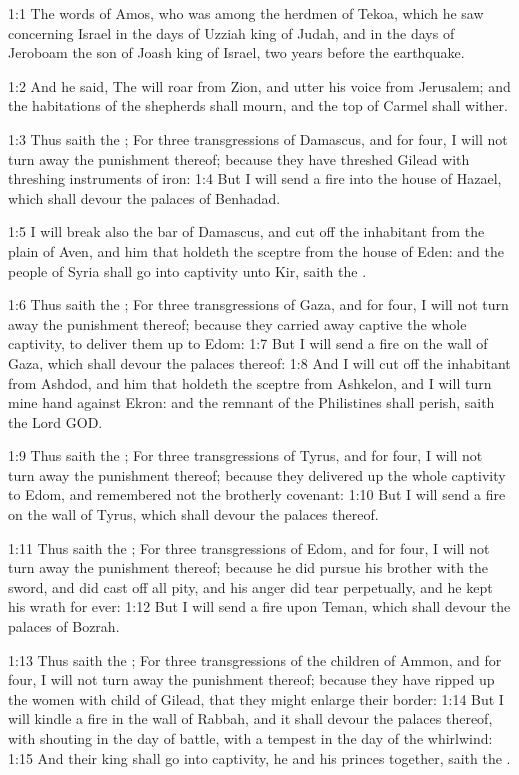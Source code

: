 

1:1 The words of Amos, who was among the herdmen of Tekoa, which he saw concerning Israel in the days of Uzziah king of Judah, and in the days of Jeroboam the son of Joash king of Israel, two years before the earthquake.

1:2 And he said, The \LORD will roar from Zion, and utter his voice from Jerusalem; and the habitations of the shepherds shall mourn, and the top of Carmel shall wither.

1:3 Thus saith the \LORD; For three transgressions of Damascus, and for four, I will not turn away the punishment thereof; because they have threshed Gilead with threshing instruments of iron: 1:4 But I will send a fire into the house of Hazael, which shall devour the palaces of Benhadad.

1:5 I will break also the bar of Damascus, and cut off the inhabitant from the plain of Aven, and him that holdeth the sceptre from the house of Eden: and the people of Syria shall go into captivity unto Kir, saith the \LORD.

1:6 Thus saith the \LORD; For three transgressions of Gaza, and for four, I will not turn away the punishment thereof; because they carried away captive the whole captivity, to deliver them up to Edom: 1:7 But I will send a fire on the wall of Gaza, which shall devour the palaces thereof: 1:8 And I will cut off the inhabitant from Ashdod, and him that holdeth the sceptre from Ashkelon, and I will turn mine hand against Ekron: and the remnant of the Philistines shall perish, saith the Lord GOD.

1:9 Thus saith the \LORD; For three transgressions of Tyrus, and for four, I will not turn away the punishment thereof; because they delivered up the whole captivity to Edom, and remembered not the brotherly covenant: 1:10 But I will send a fire on the wall of Tyrus, which shall devour the palaces thereof.

1:11 Thus saith the \LORD; For three transgressions of Edom, and for four, I will not turn away the punishment thereof; because he did pursue his brother with the sword, and did cast off all pity, and his anger did tear perpetually, and he kept his wrath for ever: 1:12 But I will send a fire upon Teman, which shall devour the palaces of Bozrah.

1:13 Thus saith the \LORD; For three transgressions of the children of Ammon, and for four, I will not turn away the punishment thereof; because they have ripped up the women with child of Gilead, that they might enlarge their border: 1:14 But I will kindle a fire in the wall of Rabbah, and it shall devour the palaces thereof, with shouting in the day of battle, with a tempest in the day of the whirlwind: 1:15 And their king shall go into captivity, he and his princes together, saith the \LORD.

